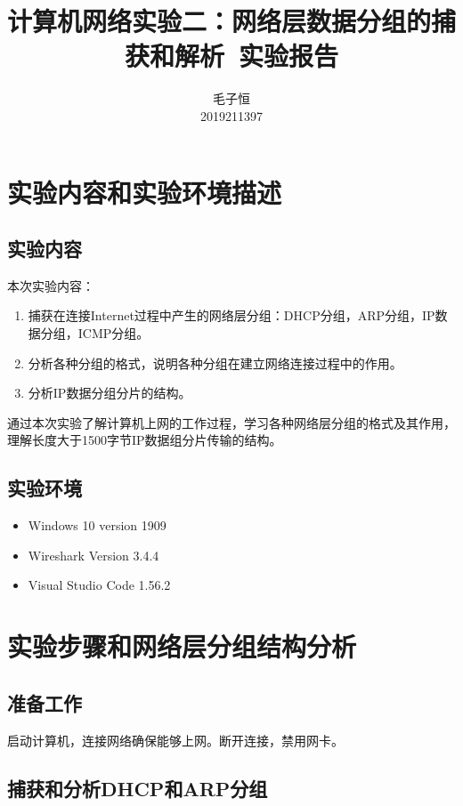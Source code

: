 \documentclass[lang=cn,11pt,a4paper,cite=authornum]{paper}
\title{计算机网络实验二：网络层数据分组的捕获和解析\ 实验报告}
\author{毛子恒 \\ 2019211397}
\institute{北京邮电大学\ 计算机学院}
\date{\zhtoday}
\begin{document}
\maketitle

\section{实验内容和实验环境描述}

\subsection{实验内容}

本次实验内容：

\begin{enumerate}
    \item 捕获在连接Internet过程中产生的网络层分组：DHCP分组，ARP分组，IP数据分组，ICMP分组。
    \item 分析各种分组的格式，说明各种分组在建立网络连接过程中的作用。
    \item 分析IP数据分组分片的结构。
\end{enumerate}

通过本次实验了解计算机上网的工作过程，学习各种网络层分组的格式及其作用，理解长度大于1500字节IP数据组分片传输的结构。

\subsection{实验环境}

\begin{itemize}
    \item Windows 10 version 1909
    \item Wireshark Version 3.4.4
    \item Visual Studio Code 1.56.2
\end{itemize}

\section{实验步骤和网络层分组结构分析}

\subsection{准备工作}

启动计算机，连接网络确保能够上网。断开连接，禁用网卡。

\subsection{捕获和分析DHCP和ARP分组}
\end{document}
